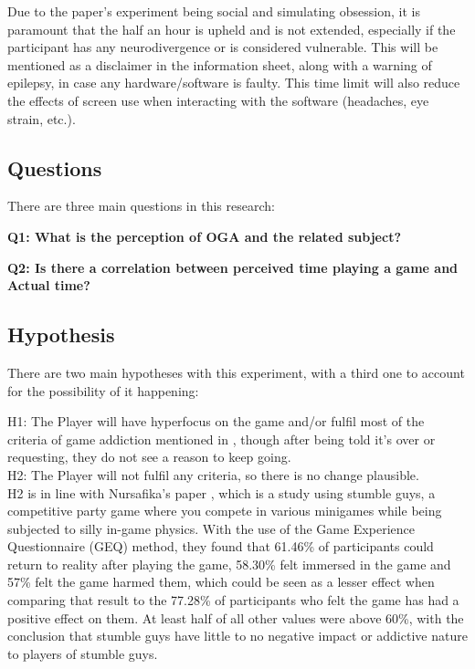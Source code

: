 \documentclass[conference]{IEEEtran}
\begin{document}
Due to the paper's experiment being social and simulating obsession, it is paramount that the half an hour is upheld and is not extended, especially if the participant has any neurodivergence or is considered vulnerable. This will be mentioned as a disclaimer in the information sheet, along with a warning of epilepsy, in case any hardware/software is faulty. This time limit will also reduce the effects of screen use when interacting with the software (headaches, eye strain, etc.). \\

\subsection{Questions}
There are three main questions in this research:

 \textbf{Q1: What is the perception of OGA and the related subject?}

 \textbf{Q2: Is there a correlation between perceived time playing a game and Actual time?}\\

\subsection{Hypothesis}
There are two main hypotheses with this experiment, with a third one to account for the possibility of it happening:

H1: The Player will have hyperfocus on the game and/or fulfil most of the criteria of game addiction mentioned in \cite{NHSHamp24}, though after being told it's over or requesting, they do not see a reason to keep going.\\

H2: The Player will not fulfil any criteria, so there is no change plausible.\\

H2 is in line with Nursafika's paper \cite{Nursafika2024}, which is a study using stumble guys, a competitive party game where you compete in various minigames while being subjected to silly in-game physics. With the use of the Game Experience Questionnaire (GEQ) method, they found that 61.46\% of participants could return to reality after playing the game, 58.30\% felt immersed in the game and 57\% felt the game harmed them, which could  be seen as a lesser effect when comparing that result to the 77.28\% of participants who felt the game has had a positive effect on them. At least half of all other values were above 60\%,  with the conclusion that stumble guys have little to no negative impact or addictive nature to players of stumble guys.\\
\end{document}
